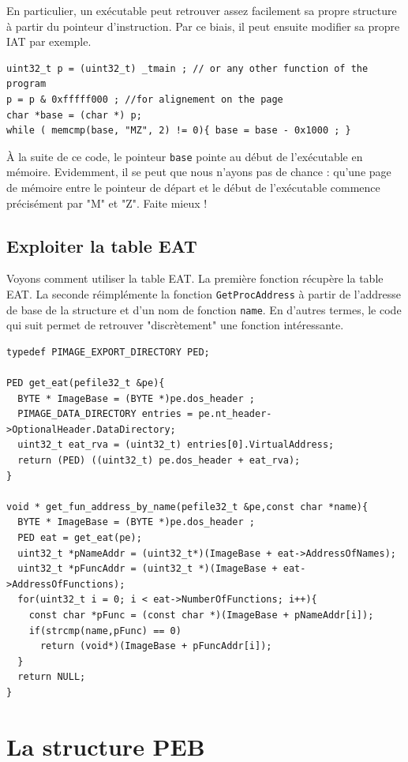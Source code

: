 \documentclass{book}
\newcommand{\code}[1]{\texttt{#1}}
\begin{document}
En particulier, un exécutable peut retrouver assez facilement sa propre structure à partir du pointeur d'instruction. Par ce biais, il peut ensuite modifier sa propre IAT par exemple. 

\begin{verbatim}
uint32_t p = (uint32_t) _tmain ; // or any other function of the program
p = p & 0xfffff000 ; //for alignement on the page
char *base = (char *) p;
while ( memcmp(base, "MZ", 2) != 0){ base = base - 0x1000 ; }
\end{verbatim}

\`A la suite de ce code, le pointeur \code{base} pointe au début de l'exécutable en mémoire. Evidemment, il se peut que nous n'ayons pas de chance : qu'une page de mémoire entre le pointeur de départ et le début de l'exécutable commence précisément par "M" et "Z". Faite mieux !

\subsection{Exploiter la table EAT}

Voyons comment utiliser la table EAT. La première fonction récupère la table EAT. La seconde réimplémente la fonction \code{GetProcAddress} à partir de l'addresse de base de la structure et d'un nom de fonction \code{name}. En d'autres termes, le code qui suit permet de retrouver "discrètement" une fonction intéressante. 

\begin{verbatim}
typedef PIMAGE_EXPORT_DIRECTORY PED;

PED get_eat(pefile32_t &pe){
  BYTE * ImageBase = (BYTE *)pe.dos_header ;
  PIMAGE_DATA_DIRECTORY entries = pe.nt_header->OptionalHeader.DataDirectory;
  uint32_t eat_rva = (uint32_t) entries[0].VirtualAddress;
  return (PED) ((uint32_t) pe.dos_header + eat_rva);
}

void * get_fun_address_by_name(pefile32_t &pe,const char *name){
  BYTE * ImageBase = (BYTE *)pe.dos_header ;
  PED eat = get_eat(pe);
  uint32_t *pNameAddr = (uint32_t*)(ImageBase + eat->AddressOfNames);
  uint32_t *pFuncAddr = (uint32_t *)(ImageBase + eat->AddressOfFunctions);
  for(uint32_t i = 0; i < eat->NumberOfFunctions; i++){
    const char *pFunc = (const char *)(ImageBase + pNameAddr[i]);
    if(strcmp(name,pFunc) == 0)
      return (void*)(ImageBase + pFuncAddr[i]);
  }
  return NULL;
}
\end{verbatim}


\section{La structure PEB}\label{sec:peb}
\end{document}
